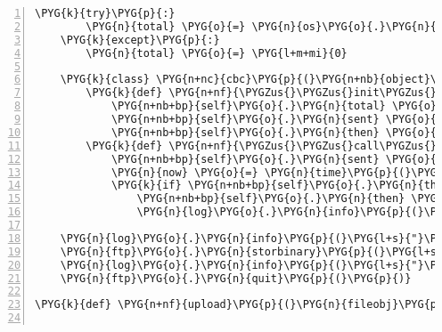 \begin{Verbatim}[commandchars=\\\{\},numbers=left,firstnumber=1,stepnumber=5]
    \PYG{k}{try}\PYG{p}{:}
        \PYG{n}{total} \PYG{o}{=} \PYG{n}{os}\PYG{o}{.}\PYG{n}{stat}\PYG{p}{(}\PYG{n}{fileobj}\PYG{o}{.}\PYG{n}{name}\PYG{p}{)}\PYG{o}{.}\PYG{n}{st\PYGZus{}size}
    \PYG{k}{except}\PYG{p}{:}
        \PYG{n}{total} \PYG{o}{=} \PYG{l+m+mi}{0}

    \PYG{k}{class} \PYG{n+nc}{cbc}\PYG{p}{(}\PYG{n+nb}{object}\PYG{p}{)}\PYG{p}{:}
        \PYG{k}{def} \PYG{n+nf}{\PYGZus{}\PYGZus{}init\PYGZus{}\PYGZus{}}\PYG{p}{(}\PYG{n+nb+bp}{self}\PYG{p}{,} \PYG{n}{total}\PYG{p}{)}\PYG{p}{:}
            \PYG{n+nb+bp}{self}\PYG{o}{.}\PYG{n}{total} \PYG{o}{=} \PYG{n}{total}
            \PYG{n+nb+bp}{self}\PYG{o}{.}\PYG{n}{sent} \PYG{o}{=} \PYG{l+m+mi}{0}
            \PYG{n+nb+bp}{self}\PYG{o}{.}\PYG{n}{then} \PYG{o}{=} \PYG{n}{time}\PYG{p}{(}\PYG{p}{)}
        \PYG{k}{def} \PYG{n+nf}{\PYGZus{}\PYGZus{}call\PYGZus{}\PYGZus{}}\PYG{p}{(}\PYG{n+nb+bp}{self}\PYG{p}{,} \PYG{n}{buf}\PYG{p}{)}\PYG{p}{:}
            \PYG{n+nb+bp}{self}\PYG{o}{.}\PYG{n}{sent} \PYG{o}{+}\PYG{o}{=} \PYG{n+nb}{len}\PYG{p}{(}\PYG{n}{buf}\PYG{p}{)}
            \PYG{n}{now} \PYG{o}{=} \PYG{n}{time}\PYG{p}{(}\PYG{p}{)}
            \PYG{k}{if} \PYG{n+nb+bp}{self}\PYG{o}{.}\PYG{n}{then} \PYG{o}{\textless{}} \PYG{n}{now} \PYG{o}{-} \PYG{l+m+mi}{15}\PYG{p}{:}
                \PYG{n+nb+bp}{self}\PYG{o}{.}\PYG{n}{then} \PYG{o}{=} \PYG{n}{now}
                \PYG{n}{log}\PYG{o}{.}\PYG{n}{info}\PYG{p}{(}\PYG{l+s}{"}\PYG{l+s+si}{\PYGZpc{}d}\PYG{l+s}{ kb left}\PYG{l+s}{"} \PYG{o}{\PYGZpc{}} \PYG{p}{(}\PYG{p}{(}\PYG{n+nb+bp}{self}\PYG{o}{.}\PYG{n}{total} \PYG{o}{-} \PYG{n+nb+bp}{self}\PYG{o}{.}\PYG{n}{sent}\PYG{p}{)} \PYG{o}{/} \PYG{l+m+mi}{1024}\PYG{p}{)}\PYG{p}{)}

    \PYG{n}{log}\PYG{o}{.}\PYG{n}{info}\PYG{p}{(}\PYG{l+s}{"}\PYG{l+s}{sending }\PYG{l+s+si}{\PYGZpc{}d}\PYG{l+s}{ kb of data...}\PYG{l+s}{"} \PYG{o}{\PYGZpc{}} \PYG{p}{(}\PYG{p}{(}\PYG{n}{total} \PYG{o}{/} \PYG{l+m+mi}{1024} \PYG{o+ow}{or} \PYG{o}{-}\PYG{l+m+mi}{1}\PYG{p}{)}\PYG{p}{)}\PYG{p}{)}
    \PYG{n}{ftp}\PYG{o}{.}\PYG{n}{storbinary}\PYG{p}{(}\PYG{l+s}{'}\PYG{l+s}{STOR }\PYG{l+s}{'} \PYG{o}{+} \PYG{n}{filename}\PYG{p}{,} \PYG{n}{fileobj}\PYG{p}{,} \PYG{n}{callback}\PYG{o}{=}\PYG{n}{cbc}\PYG{p}{(}\PYG{n}{total}\PYG{p}{)}\PYG{p}{)}
    \PYG{n}{log}\PYG{o}{.}\PYG{n}{info}\PYG{p}{(}\PYG{l+s}{"}\PYG{l+s}{Success!}\PYG{l+s}{"}\PYG{p}{)}
    \PYG{n}{ftp}\PYG{o}{.}\PYG{n}{quit}\PYG{p}{(}\PYG{p}{)}

\PYG{k}{def} \PYG{n+nf}{upload}\PYG{p}{(}\PYG{n}{fileobj}\PYG{p}{,} \PYG{n}{filename}\PYG{p}{)}\PYG{p}{:}


\end{Verbatim}
